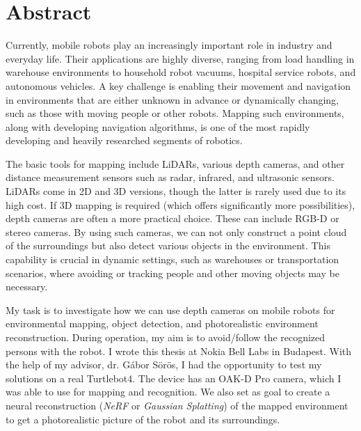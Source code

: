 \vfill
\selectenglish


\chapter*{Abstract}

Currently, mobile robots play an increasingly important role in industry and everyday life. Their applications are highly diverse, ranging from load handling in warehouse environments to household robot vacuums, hospital service robots, and autonomous vehicles. A key challenge is enabling their movement and navigation in environments that are either unknown in advance or dynamically changing, such as those with moving people or other robots. Mapping such environments, along with developing navigation algorithms, is one of the most rapidly developing and heavily researched segments of robotics.

The basic tools for mapping include LiDARs, various depth cameras, and other distance measurement sensors such as radar, infrared, and ultrasonic sensors. LiDARs come in 2D and 3D versions, though the latter is rarely used due to its high cost. If 3D mapping is required (which offers significantly more possibilities), depth cameras are often a more practical choice. These can include RGB-D or stereo cameras. By using such cameras, we can not only construct a point cloud of the surroundings but also detect various objects in the environment. This capability is crucial in dynamic settings, such as warehouses or transportation scenarios, where avoiding or tracking people and other moving objects may be necessary.

My task is to investigate how we can use depth cameras on mobile robots for environmental mapping, object detection, and photorealistic environment reconstruction. During operation, my aim is to avoid/follow the recognized persons with the robot. I wrote this thesis at Nokia Bell Labs in Budapest. With the help of my advisor, dr. Gábor Sörös, I had the opportunity to test my solutions on a real Turtlebot4. The device has an OAK-D Pro camera, which I was able to use for mapping and recognition. We also set as goal to create a neural reconstruction (\textit {NeRF} or \textit{Gaussian Splatting}) of the mapped environment to get a photorealistic picture of the robot and its surroundings.

\vfill
\selectthesislanguage

\setcounter{romanPage}{\value{page}}
